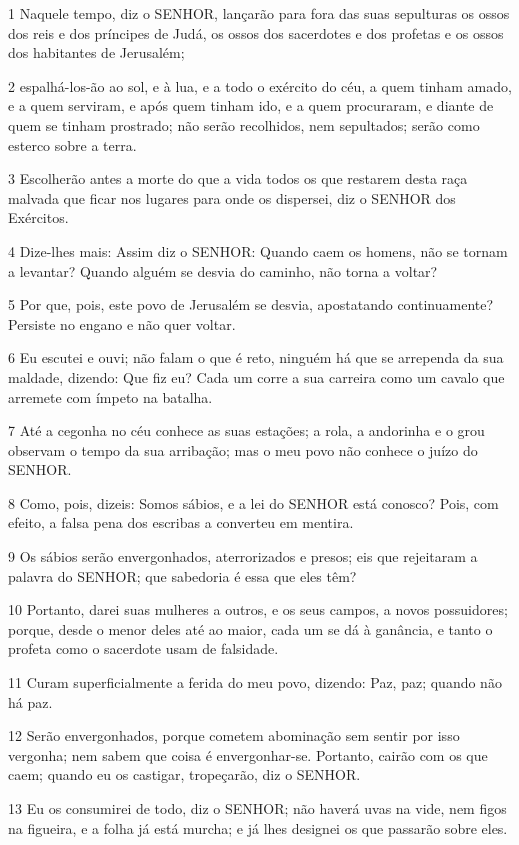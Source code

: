 \par 1 Naquele tempo, diz o SENHOR, lançarão para fora das suas sepulturas os ossos dos reis e dos príncipes de Judá, os ossos dos sacerdotes e dos profetas e os ossos dos habitantes de Jerusalém;
\par 2 espalhá-los-ão ao sol, e à lua, e a todo o exército do céu, a quem tinham amado, e a quem serviram, e após quem tinham ido, e a quem procuraram, e diante de quem se tinham prostrado; não serão recolhidos, nem sepultados; serão como esterco sobre a terra.
\par 3 Escolherão antes a morte do que a vida todos os que restarem desta raça malvada que ficar nos lugares para onde os dispersei, diz o SENHOR dos Exércitos.
\par 4 Dize-lhes mais: Assim diz o SENHOR: Quando caem os homens, não se tornam a levantar? Quando alguém se desvia do caminho, não torna a voltar?
\par 5 Por que, pois, este povo de Jerusalém se desvia, apostatando continuamente? Persiste no engano e não quer voltar.
\par 6 Eu escutei e ouvi; não falam o que é reto, ninguém há que se arrependa da sua maldade, dizendo: Que fiz eu? Cada um corre a sua carreira como um cavalo que arremete com ímpeto na batalha.
\par 7 Até a cegonha no céu conhece as suas estações; a rola, a andorinha e o grou observam o tempo da sua arribação; mas o meu povo não conhece o juízo do SENHOR.
\par 8 Como, pois, dizeis: Somos sábios, e a lei do SENHOR está conosco? Pois, com efeito, a falsa pena dos escribas a converteu em mentira.
\par 9 Os sábios serão envergonhados, aterrorizados e presos; eis que rejeitaram a palavra do SENHOR; que sabedoria é essa que eles têm?
\par 10 Portanto, darei suas mulheres a outros, e os seus campos, a novos possuidores; porque, desde o menor deles até ao maior, cada um se dá à ganância, e tanto o profeta como o sacerdote usam de falsidade.
\par 11 Curam superficialmente a ferida do meu povo, dizendo: Paz, paz; quando não há paz.
\par 12 Serão envergonhados, porque cometem abominação sem sentir por isso vergonha; nem sabem que coisa é envergonhar-se. Portanto, cairão com os que caem; quando eu os castigar, tropeçarão, diz o SENHOR.
\par 13 Eu os consumirei de todo, diz o SENHOR; não haverá uvas na vide, nem figos na figueira, e a folha já está murcha; e já lhes designei os que passarão sobre eles.
